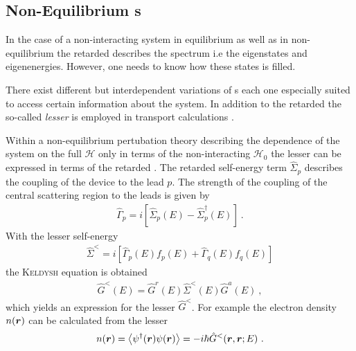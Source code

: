 \subsection{Non-Equilibrium \cgfnc s}
In the case of a non-interacting system in equilibrium as well as in non-equilibrium the retarded \gfnc{} describes the spectrum i.e the eigenstates and eigenenergies. However, one needs to know how these states is filled.\par 
There exist different but interdependent variations of \gfnc s each one especially suited to access certain information about the system.
In addition to the retarded \gfnc{} the so-called \emph{lesser \gfnc{}} is employed in transport calculations \cite{haug2008quantum}.\par
Within a non-equilibrium pertubation theory describing the dependence of the system on the full \hamil{} $\mathcal{H}$ only in terms of the non-interacting \hamil{} $\mathcal{H}_0$ \cite{Jauho2006} the lesser \gfnc{} can be expressed in terms of the retarded \gfnc{}. The retarded self-energy term $\hat{\Sigma}_p$ describes the coupling of the device to the lead $p$. The strength of the coupling of the central scattering region to the leads is given by \cite{datta2005quantum}
\begin{align}
\hat{\Gamma}_p = i\left[\hat{\Sigma}_p(E)-\hat{\Sigma}_p^{\dagger}(E)\right]\ .
\end{align}
With the lesser self-energy
\begin{align}
\hat{\Sigma}^<=i\left[\hat{\Gamma}_p(E)f_p(E)+\hat{\Gamma}_q(E)f_q(E) \right]
\end{align}
the \textsc{Keldysh} equation is obtained
\begin{align}
\hat{G}^<(E) = \hat{G}^r(E) \hat{\Sigma}^<(E) \hat{G}^a(E)\ ,
\label{eqn:keldyshequation}
\end{align}
which yields an expression for the lesser \gfnc{} $\hat{G}^<$.
For example the electron density  $n(\boldsymbol{r})$ can be calculated from the lesser \gfnc{}
\begin{align}
	n(\boldsymbol{r}) = \left< \psi^{\dagger} (\boldsymbol{r}) \psi(\boldsymbol{r})\right> = -i\hbar \hat{G}^<(\boldsymbol{r},\boldsymbol{r};E)\ .
	\label{eqn:edensfromgreensfnc}
\end{align}

